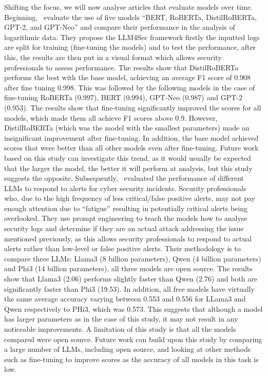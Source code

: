 Shifting the focus, we will now analyse articles that evaluate models over time. Beginning,~\cite{karlsen2024benchmarking} evaluate the use of five models ``BERT, RoBERTa, DistilRoBERTa, GPT-2, and GPT-Neo'' and compare their performance in the analysis of logarithmic data. They propose the LLM4Sec framework firstly the inputted logs are split for training (fine-tuning the models) and to test the performance, after this, the results are then put in a visual format which allows security professionals to assess performance. The results show that DistilRoBERTa performs the best with the base model, achieving an average F1 score of 0.908 after fine tuning 0.998. This was followed by the following models in the case of fine-tuning RoBERTa (0.997), BERT (0.994), GPT-Neo (0.987) and GPT-2 (0.953). The results show that fine-tuning significantly improved the scores for all models, which made them all achieve F1 scores above 0.9. However, DistilRoBERTa (which was the model with the smallest parameters) made an insignificant improvement after fine-tuning. In addition, the base model achieved scores that were better than all other models even after fine-tuning. Future work based on this study can investigate this trend, as it would usually be expected that the larger the model, the better it will perform at analysis, but this study suggests the opposite. Subsequently,~\cite{jonkhout2024evaluating} evaluated the performance of different LLMs to respond to alerts for cyber security incidents. Security professionals who, due to the high frequency of less critical/false positive alerts, may not pay enough attention due to ``fatigue'' resulting in potentially critical alerts being overlooked. They use prompt engineering to teach the models how to analyse security logs and determine if they are an actual attack addressing the issue mentioned previously, as this allows security professionals to respond to actual alerts rather than low-level or false positive alerts. Their methodology is to compare three LLMs: Llama3 (8 billion parameters), Qwen (4 billion parameters) and Phi3 (14 billion parameters), all three models are open source. The results show that Llama3 (2.06) performs slightly faster than Qwen (2.76) and both are significantly faster than Phi3 (19.53). In addition, all free models have virtually the same average accuracy varying between 0.553 and 0.556 for LLama3 and Qwen respectively to PHi3, which was 0.573. This suggests that although a model has larger parameters as in the case of this study, it may not result in any noticeable improvements. A limitation of this study is that all the models compared were open source. Future work can build upon this study by comparing a large number of LLMs, including open source, and looking at other methods such as fine-tuning to improve scores as the accuracy of all models in this task is low. 

